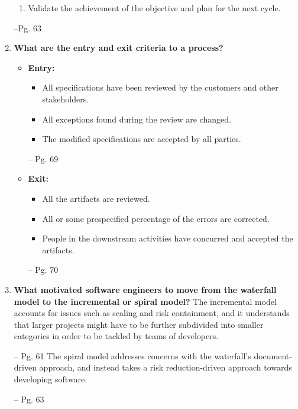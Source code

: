 \documentclass[11pt]{article}
\begin{document}
\begin{enumerate}
\begin{enumerate}
        \item Validate the achievement of the objective and plan for the next cycle. 
    \end{enumerate}
    --Pg. 63
  
    \item \textbf{What are the entry and exit criteria to a process?}
    
    \begin{itemize}
        \item \textbf{Entry: } 
        \begin{itemize}
            \item All specifications have been reviewed by the customers and other stakeholders.
            \item All exceptions found during the review are changed. 
            \item The modified specifications are accepted by all parties. 
        \end{itemize}
        -- Pg. 69
        
        \item \textbf{Exit: }
        \begin{itemize}
            \item All the artifacts are reviewed.
            \item All or some prespecified percentage of the errors are corrected. 
            \item People in the downstream activities have concurred and accepted the artifacts.
        \end{itemize}
        -- Pg. 70
        
    \end{itemize}
    
    \item \textbf{What motivated software engineers to move from the waterfall model to the incremental or spiral model?}
    \newline
    The incremental model accounts for issues such as scaling and risk containment, and it understands that larger projects might have to be further subdivided into smaller categories in order to be tackled by teams of developers. 
    
    -- Pg. 61
    \newline
    The spiral model addresses concerns with the waterfall's document-driven approach, and instead takes a risk reduction-driven approach towards developing software. 
    
    -- Pg. 63
    

\end{enumerate}
\end{document}
